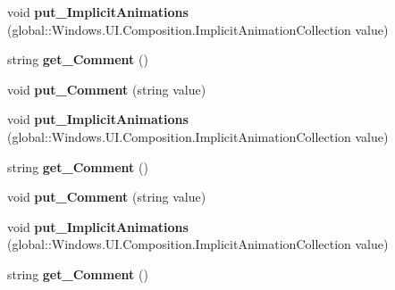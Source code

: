 \begin{DoxyCompactItemize}
void {\bfseries put\+\_\+\+Implicit\+Animations} (global\+::\+Windows.\+U\+I.\+Composition.\+Implicit\+Animation\+Collection value)
\item 
\mbox{\label{interface_windows_1_1_u_i_1_1_composition_1_1_i_composition_object2_af58ddc1f26fe2c8ff74092881eccb458}} 
string {\bfseries get\+\_\+\+Comment} ()
\item 
\mbox{\label{interface_windows_1_1_u_i_1_1_composition_1_1_i_composition_object2_a724426452fb19b2b146681bf0b264ac1}} 
void {\bfseries put\+\_\+\+Comment} (string value)
\item 
\mbox{\label{interface_windows_1_1_u_i_1_1_composition_1_1_i_composition_object2_a968d62a160aef72621974d9f819c661b}} 
void {\bfseries put\+\_\+\+Implicit\+Animations} (global\+::\+Windows.\+U\+I.\+Composition.\+Implicit\+Animation\+Collection value)
\item 
\mbox{\label{interface_windows_1_1_u_i_1_1_composition_1_1_i_composition_object2_af58ddc1f26fe2c8ff74092881eccb458}} 
string {\bfseries get\+\_\+\+Comment} ()
\item 
\mbox{\label{interface_windows_1_1_u_i_1_1_composition_1_1_i_composition_object2_a724426452fb19b2b146681bf0b264ac1}} 
void {\bfseries put\+\_\+\+Comment} (string value)
\item 
\mbox{\label{interface_windows_1_1_u_i_1_1_composition_1_1_i_composition_object2_a968d62a160aef72621974d9f819c661b}} 
void {\bfseries put\+\_\+\+Implicit\+Animations} (global\+::\+Windows.\+U\+I.\+Composition.\+Implicit\+Animation\+Collection value)
\item 
\mbox{\label{interface_windows_1_1_u_i_1_1_composition_1_1_i_composition_object2_af58ddc1f26fe2c8ff74092881eccb458}} 
string {\bfseries get\+\_\+\+Comment} ()
\item 

\end{DoxyCompactItemize}
